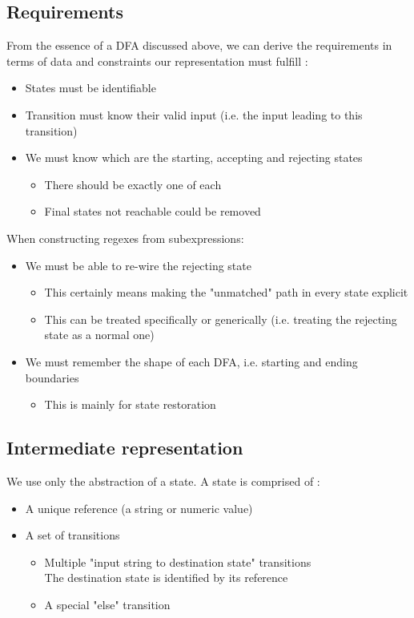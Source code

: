 \documentclass[11pt,a4paper]{report}
\begin{document}
\subsection{Requirements}

From the essence of a DFA discussed above, we can derive the requirements in terms of data and constraints our representation must fulfill :
\begin{itemize}
\item States must be identifiable
\item Transition must know their valid input (i.e. the input leading to this transition)
\item We must know which are the starting, accepting and rejecting states
	\begin{itemize}
	\item There should be exactly one of each
	\item Final states not reachable could be removed
	\end{itemize}
\end{itemize}

When constructing regexes from subexpressions:
\begin{itemize}
\item We must be able to re-wire the rejecting state
	\begin{itemize}
	\item This certainly means making the "unmatched" path in every state explicit
	\item This can be treated specifically or generically (i.e. treating the rejecting state as a normal one)
	\end{itemize}
\item We must remember the shape of each DFA, i.e. starting and ending boundaries
	\begin{itemize}
	\item This is mainly for state restoration
	\end{itemize}
\end{itemize}

\subsection{Intermediate representation}

We use only the abstraction of a state. A state is comprised of :
\begin{itemize}
\item A unique reference (a string or numeric value)
\item A set of transitions
	\begin{itemize}
	\item Multiple "input string to destination state" transitions\\
		The destination state is identified by its reference
	\item A special "else" transition
	\end{itemize}
\end{itemize}
\end{document}
